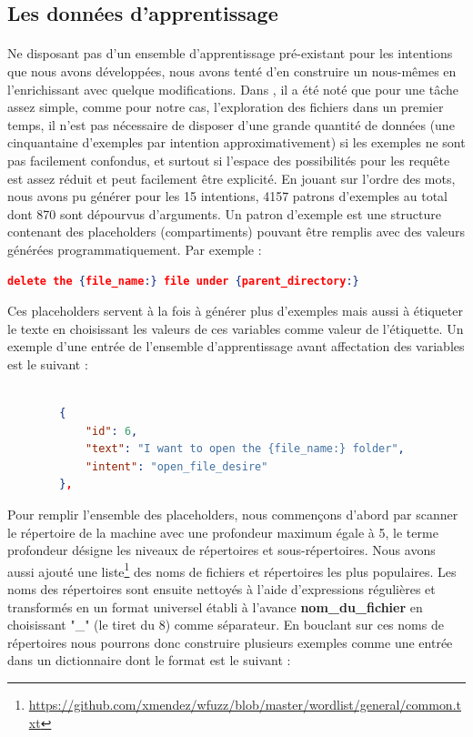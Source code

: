 		\subsection{Les données d'apprentissage}
		\paragraph{}
		\label{nlu_dataset}
		Ne disposant pas d'un ensemble d'apprentissage pré-existant pour les intentions que nous avons développées, nous avons tenté d'en construire un nous-mêmes en l'enrichissant avec quelque modifications. Dans \citep{rasa_nlu}, il a été noté que pour une tâche assez simple, comme pour notre cas, l'exploration des fichiers dans un premier temps, il n'est pas nécessaire de disposer d'une grande quantité de données (une cinquantaine d'exemples par intention approximativement) si les exemples ne sont pas facilement confondus, et surtout si l'espace des possibilités pour les requête est assez réduit et peut facilement être explicité. En jouant sur l'ordre des mots, nous avons pu générer pour les 15 intentions, 4157 patrons d'exemples au total dont 870 sont dépourvus d'arguments. Un patron d'exemple est une structure contenant des placeholders (compartiments) pouvant être remplis avec des valeurs générées programmatiquement. Par exemple : 
		\begin{lstlisting}[language=json]
		delete the {file_name:} file under {parent_directory:}\end{lstlisting}
		Ces placeholders servent à la fois à générer plus d'exemples mais aussi à étiqueter le texte en choisissant les valeurs de ces variables comme valeur de l'étiquette. Un exemple d'une entrée de l'ensemble d'apprentissage avant affectation des variables est le suivant : 
		\begin{lstlisting}[language=json]
		
		{
			"id": 6,
			"text": "I want to open the {file_name:} folder",
			"intent": "open_file_desire"
		},
		\end{lstlisting}
		Pour remplir l'ensemble des placeholders, nous commençons d'abord par scanner le répertoire de la machine avec une profondeur maximum égale à 5, le terme profondeur désigne les niveaux de répertoires et sous-répertoires. Nous avons aussi ajouté une liste\footnote{\url{https://github.com/xmendez/wfuzz/blob/master/wordlist/general/common.txt}} des noms de fichiers et répertoires les plus populaires.
		Les noms des répertoires sont ensuite nettoyés à l'aide d'expressions régulières et transformés en un format universel établi à l'avance \textbf{nom\_du\_fichier} en choisissant "\_" (le tiret du 8) comme séparateur. En bouclant sur ces noms de répertoires nous pourrons donc construire plusieurs exemples comme une entrée dans un dictionnaire dont le format est le suivant : 
